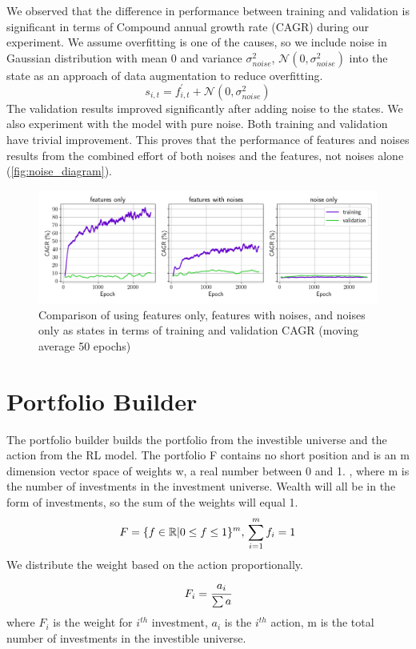 We observed that the difference in performance between training and validation is significant in terms of Compound annual growth rate (CAGR) during our experiment. We assume overfitting is one of the causes, so we include noise in Gaussian distribution with mean 0 and variance \(\sigma_{noise}^2\), \(\mathcal{N}(0,\sigma_{noise}^2)\) into the state as an approach of data augmentation to reduce overfitting.
\[
    s_{i,t} = f^{'}_{i,t} + \mathcal{N}(0,\sigma_{noise}^2)
\]
The validation results improved significantly after adding noise to the states. We also experiment with the model with pure noise. Both training and validation have trivial improvement. This proves that the performance of features and noises results from the combined effort of both noises and the features, not noises alone (\autoref{fig:noise_diagram}). 
\begin{figure}[htb]
  \includegraphics[width=15cm]{images/compare_noise.png}
  \caption [Comparison of features/noise] {Comparison of using features only, features with noises, and noises only as states in terms of training and validation CAGR (moving average 50 epochs)}
  \label{fig:noise_diagram}
\end{figure}

\section {Portfolio Builder}
The portfolio builder builds the portfolio from the investible universe and the action from the RL model.
The portfolio F contains no short position and is an m dimension vector space of weights w, a real number between 0 and 1. , where m is the number of investments in the investment universe. Wealth will all be in the form of investments, so the sum of the weights will equal 1.
\[
    F = \{ {f \in \mathbb{R} | 0 \leq f \leq 1 } \} ^m,
    \\
    \sum_{i=1}^m {f_i} =1
\]
We distribute the weight based on the action proportionally.
\[
    F_i = \cfrac{a_i}{\sum a} 
\]
where \(F_i\) is the weight for \(i^{th}\) investment, \(a_i\) is the  \(i^{th}\) action, m is the total number of investments in the investible universe. 

